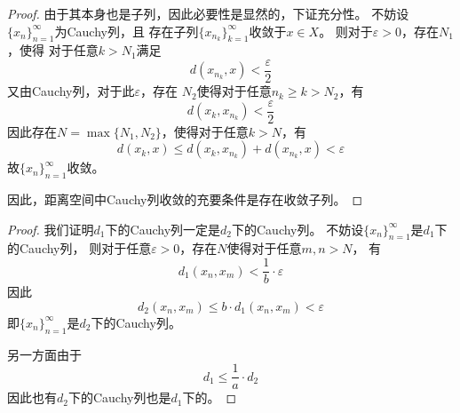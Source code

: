 \documentclass[cn]{homework}
\begin{document}
    \problem
    \begin{proof}
        由于其本身也是子列，因此必要性是显然的，下证充分性。
        不妨设$\{x_n\}_{n=1}^\infty$为Cauchy列，且
        存在子列$\{x_{n_k}\}_{k=1}^\infty$收敛于$x\in X$。
        则对于$\varepsilon>0$，存在$N_1$，使得
        对于任意$k>N_1$满足
        \[d(x_{n_k},x)<\frac{\varepsilon}{2}\]
        又由Cauchy列，对于此$\varepsilon$，存在
        $N_2$使得对于任意$n_k\geq k>N_2$，有
        \[d(x_k,x_{n_k})<\frac{\varepsilon}{2}\]
        因此存在$N=\max\{N_1,N_2\}$，使得对于任意$k>N$，有
        \[d(x_k,x)\leq d(x_k,x_{n_k})+d(x_{n_k},x)<\varepsilon\]
        故$\{x_n\}_{n=1}^\infty$收敛。

        因此，距离空间中Cauchy列收敛的充要条件是存在收敛子列。
    \end{proof}

    \problem
    \begin{proof}
        我们证明$d_1$下的Cauchy列一定是$d_2$下的Cauchy列。
        不妨设$\{x_n\}_{n=1}^\infty$是$d_1$下的Cauchy列，
        则对于任意$\varepsilon>0$，存在$N$使得对于任意$m,n>N$，
        有
        \[d_1(x_n,x_m)<\frac{1}{b}\cdot\varepsilon\]
        因此
        \[d_2(x_n,x_m)\leq b\cdot d_1(x_n,x_m)<\varepsilon\]
        即$\{x_n\}_{n=1}^\infty$是$d_2$下的Cauchy列。

        另一方面由于
        \[d_1\leq\frac{1}{a}\cdot d_2\]
        因此也有$d_2$下的Cauchy列也是$d_1$下的。
    \end{proof}
\end{document}
